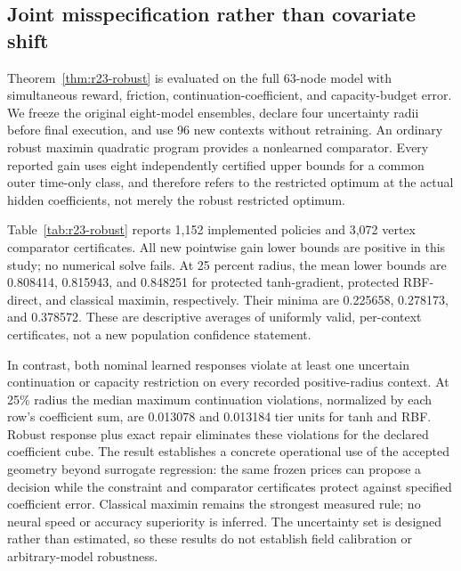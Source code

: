 \subsection{Joint misspecification rather than covariate shift}
Theorem~\ref{thm:r23-robust} is evaluated on the full 63-node model with simultaneous reward, friction, continuation-coefficient, and capacity-budget error. We freeze the original eight-model ensembles, declare four uncertainty radii before final execution, and use 96 new contexts without retraining. An ordinary robust maximin quadratic program provides a nonlearned comparator. Every reported gain uses eight independently certified upper bounds for a common outer time-only class, and therefore refers to the restricted optimum at the actual hidden coefficients, not merely the robust restricted optimum.

Table~\ref{tab:r23-robust} reports 1,152 implemented policies and 3,072 vertex comparator certificates. All new pointwise gain lower bounds are positive in this study; no numerical solve fails. At 25 percent radius, the mean lower bounds are 0.808414, 0.815943, and 0.848251 for protected tanh-gradient, protected RBF-direct, and classical maximin, respectively. Their minima are 0.225658, 0.278173, and 0.378572. These are descriptive averages of uniformly valid, per-context certificates, not a new population confidence statement.

In contrast, both nominal learned responses violate at least one uncertain continuation or capacity restriction on every recorded positive-radius context. At 25\% radius the median maximum continuation violations, normalized by each row's coefficient sum, are 0.013078 and 0.013184 tier units for tanh and RBF. Robust response plus exact repair eliminates these violations for the declared coefficient cube. The result establishes a concrete operational use of the accepted geometry beyond surrogate regression: the same frozen prices can propose a decision while the constraint and comparator certificates protect against specified coefficient error. Classical maximin remains the strongest measured rule; no neural speed or accuracy superiority is inferred. The uncertainty set is designed rather than estimated, so these results do not establish field calibration or arbitrary-model robustness.

